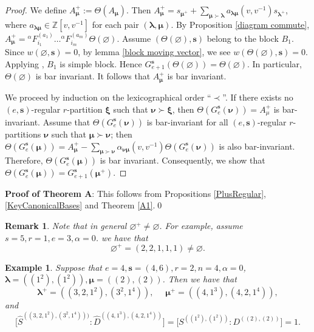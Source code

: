 \documentclass[a4paper,10pt]{amsart}
\theoremstyle{plain}
\newcommand{\bvarnothing}{{\boldsymbol \varnothing}}
\def\bs{{\boldsymbol{s}}}
\def\bxi{{\boldsymbol \xi}}
\def\blam{{\boldsymbol \lambda}}
\def\bmu{{\boldsymbol \mu}}
\def\bnu{{\boldsymbol \nu}}
\theoremstyle{plain}
\newtheorem{example}[theorem]{Example}
\newtheorem{remark}[theorem]{Remark}
\numberwithin{equation}{section}
\begin{document}
\begin{proof}
We define $A^+_\bmu := \varTheta(A_\bmu)$. Then $A^+_\bmu = s_{\bmu^+} + \sum_{\bmu\succ\blam} a_{\blam \bmu}(v,v^{-1}) s_{\blam^+}$, where $a_{\blam \bmu} \in \mathbb Z[v, v^{-1}]$ for each pair $(\blam,\bmu)$.
By Proposition \ref{diagram commute}, $A^+_\bmu={{^\alpha}\! F}_{{i}_1}^{(a_1)}\ldots {{^\alpha}\!F}_{{i}_m}^{(a_m)}\varTheta(\bvarnothing)$.
Assume $(\varTheta(\bvarnothing), \bs)$ belong to the block $B_1$. Since $w(\bvarnothing, \bs)=0$, by lemma \ref{block moving vector}, we see $w(\varTheta(\bvarnothing), \bs)=0$. Applying \cite[Theorem 4.1]{F1}, $B_1$ is simple block. Hence $G^\bs_{e+1}(\varTheta(\bvarnothing))=\varTheta (\bvarnothing)$. In particular, $\varTheta(\bvarnothing)$ is bar invariant. It follows that $A^+_\bmu$ is bar invariant.

We proceed by induction on the lexicographical order ``$\prec$''. If there exists no $(e,\bs)$-regular $r$-partition $\bxi$ such that $\bnu \succ \bxi$, then $\varTheta(G^\bs_e(\bnu)) = A^+_\mu$ is bar-invariant. Assume that $\varTheta(G^\bs_e(\bnu))$ is bar-invariant for all $(e,\bs)$-regular $r$-partitions $\bnu$ such that $\bmu\succ\bnu$; then $\varTheta(G^\bs_e(\bmu)) = A_\bmu^+ - \sum_{\bmu\succ\bnu} \alpha_{\bnu\bmu}(v,v^{-1}) \varTheta(G^\bs_e(\bnu))$ is also bar-invariant. Therefore, $\varTheta(G^\bs_e(\bmu))$ is bar invariant. Consequently, we show that $\varTheta (G^\bs_e(\bmu))=G^\bs_{e+1}(\bmu^+)$.
\end{proof}




\medskip
\noindent
{\textbf{Proof of Theorem A}: } This follows from Propositions \ref{PlusRegular}, \ref{KeyCanonicalBases} and Theorem \ref{A1}.\hfill\qed
\medskip





\begin{remark} Note that in general $\varnothing^{+}\neq\varnothing$. For example, assume $s=5, r=1, e=3, \alpha=0$. we have that $$
\varnothing^{+}=(2,2,1,1,1)\neq\varnothing.
$$
\end{remark}

\begin{example} Suppose that $e=4, \bs=(4,6), r=2, n=4, \alpha=0$, $\blam=((1^2),(1^2)), \bmu=((2),(2))$. Then we have that $$
\blam^+=((3,2,1^2),(3^2,1^4)),\,\,\quad\bmu^+=((4,1^3),(4,2,1^4)), $$
and $$
\bigl[\hat{S}^{((3,2,1^2),(3^2,1^4)))}:\hat{D}^{((4,1^3),(4,2,1^4))}\bigr]=\bigl[S^{((1^2),(1^2))}:D^{((2),(2))}\bigr]=1.
$$
\end{example}
\end{document}
